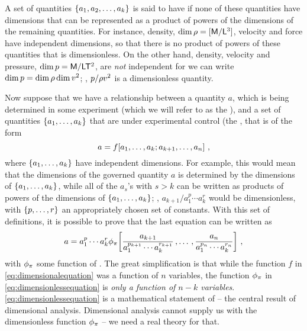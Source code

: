A set of quantities $\left\lbrace{a_1, a_2, \dotsc, a_k}\right\rbrace$ is said to have  if none of these quantities have dimensions that can be represented as a product of powers of the dimensions of the remaining quantities. For instance, density, $\dim\rho = [\mathsf{M}/\mathsf{L}^3]$, velocity and force have independent dimensions, so that there is no product of powers of these quantities that is dimensionless. On the other hand, density, velocity and pressure, $\dim p = \mathsf{M}/\mathsf{L}\mathsf{T}^2$, are \emph{not} independent for we can write $\dim p = \dim\rho\dim v^2$; \ie, $p/\rho v^2$ is a dimensionless quantity.

Now suppose that we have a relationship between a quantity $a$, which is being determined in some experiment (which we will refer to as the ), and a set of quantities $\left\lbrace{a_1, \dotsc, a_k}\right\rbrace$ that are under experimental control (the , that is of the form
\begin{equation}\label{eq:dimensionalequation}
a = f\!\left[{a_1, \dotsc, a_k; a_{k + 1}, \dotsc, a_n}\right]\,,
\end{equation}
where $\left\lbrace{a_1, \dotsc, a_k}\right\rbrace$ have independent dimensions. For example, this would mean that the dimensions of the governed quantity $a$ is determined by the dimensions of $\left\lbrace{a_1, \dotsc, a_k}\right\rbrace$, while all of the $a_s$'s with $s > k$ can be written as products of powers of the dimensions of $\left\lbrace{a_1, \dotsc, a_k}\right\rbrace$; \eg, $a_{k + 1}/a_1^p\dotsb a_k^r$ would be dimensionless, with $\left\lbrace{p, \dotsc, r}\right\rbrace$ an appropriately chosen set of constants. With this set of definitions, it is possible to prove that the last equation can be written as
\begin{equation}\label{eq:dimensionlessequation}
a = a_1^p\dotsb a_k^r\phi_{\pi}\!\left[{
    \dfrac{a_{k + 1}}{a_1^{p_{k + 1}}\dotsb a_k^{r_{k + 1}}}\,,
    \dotsc\,,
    \dfrac{a_{n}}{a_1^{p_{n}}\dotsb a_k^{r_{n}}}
    }\right]\,,
\end{equation}
with $\phi_{\pi}$ some function of . The great simplification is that while the function $f$ in 
\autoref{eq:dimensionalequation} was a function of $n$ variables, the function $\phi_{\pi}$ in \autoref{eq:dimensionlessequation} is \emph{only a function of $n - k$ variables}. \autoref{eq:dimensionlessequation} is a mathematical statement of  -- the central result of dimensional analysis. Dimensional analysis cannot supply us with the dimensionless function $\phi_{\pi}$ -- we need a real theory for that.

